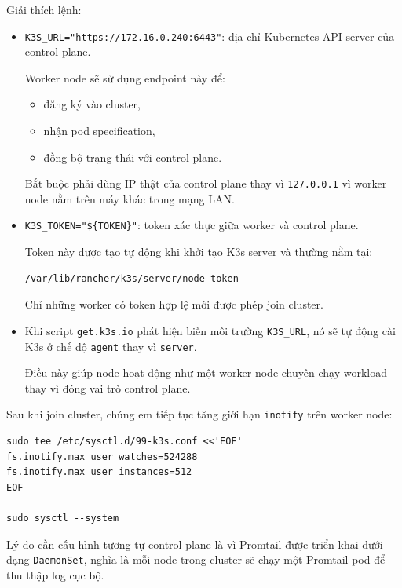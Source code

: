Giải thích lệnh:
\begin{itemize}
    \item \texttt{K3S\_URL="https://172.16.0.240:6443"}: địa chỉ Kubernetes API server của control plane.
    
    Worker node sẽ sử dụng endpoint này để:
    
    \begin{itemize}
        \item đăng ký vào cluster,
        \item nhận pod specification,
        \item đồng bộ trạng thái với control plane.
    \end{itemize}
    
    Bắt buộc phải dùng IP thật của control plane thay vì \texttt{127.0.0.1} vì worker node nằm trên máy khác trong mạng LAN.
    
    \item \texttt{K3S\_TOKEN="\$\{TOKEN\}"}: token xác thực giữa worker và control plane.
    
    Token này được tạo tự động khi khởi tạo K3s server và thường nằm tại:
    
\begin{verbatim}
/var/lib/rancher/k3s/server/node-token
\end{verbatim}

    Chỉ những worker có token hợp lệ mới được phép join cluster.
    
    \item Khi script \texttt{get.k3s.io} phát hiện biến môi trường \texttt{K3S\_URL}, nó sẽ tự động cài K3s ở chế độ \texttt{agent} thay vì \texttt{server}.
    
    Điều này giúp node hoạt động như một worker node chuyên chạy workload thay vì đóng vai trò control plane.
\end{itemize}

\vspace{0.5em}

Sau khi join cluster, chúng em tiếp tục tăng giới hạn \texttt{inotify} trên worker node:

\begin{verbatim}
sudo tee /etc/sysctl.d/99-k3s.conf <<'EOF'
fs.inotify.max_user_watches=524288
fs.inotify.max_user_instances=512
EOF

sudo sysctl --system
\end{verbatim}

Lý do cần cấu hình tương tự control plane là vì Promtail được triển khai dưới dạng \texttt{DaemonSet}, nghĩa là mỗi node trong cluster sẽ chạy một Promtail pod để thu thập log cục bộ.

